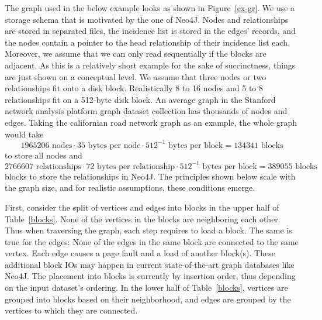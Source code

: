   The graph used in the below example looks as shown in Figure~\ref{ex-gr}.
  We use a storage schema that is motivated by the one of Neo4J.
  Nodes and relationships are stored in separated files, the incidence list is stored in the edges' records, and the nodes contain a pointer to the head relationship of their incidence list each. 
  Moreover, we assume that we can only read sequentially if the blocks are adjacent.
  As this is a relatively short example for the sake of succinctness, things are just shown on a conceptual level. 
  We assume that three nodes or two relationships fit onto a disk block. 
  Realistically 8 to 16 nodes and 5 to 8 relationships fit on a 512-byte disk block. 
  An average graph in the Stanford network analysis platform graph dataset collection has thousands of nodes and edges. 
  Taking the californian road network graph as an example, the whole graph would take 
  \[ 1 965 206 \text{ nodes} \cdot 35 \text{ bytes per node} \cdot 512^{-1} \text{ bytes per block} = 134 341\text{ blocks}\] 
  to store all nodes and 
  \[2 766 607 \text{ relationships} \cdot 72 \text{ bytes per relationship} \cdot 512^{-1} \text{ bytes per block} = 389055\text{ blocks}\] 
  blocks to store the relationships in Neo4J.
  The principles shown below scale with the graph size, and for realistic assumptions, these conditions emerge.

  First, consider the split of vertices and edges into blocks in the upper half of Table~\ref{blocks}. 
  None of the vertices in the blocks are neighboring each other.
  Thus when traversing the graph, each step requires to load a block.
  The same is true for the edges: 
  None of the edges in the same block are connected to the same vertex. 
  Each edge causes a page fault and a load of another block(s).
  These additional block IOs may happen in current state-of-the-art graph databases like Neo4J. 
  The placement into blocks is currently by insertion order, thus depending on the input dataset's ordering. 
  In the lower half of Table~\ref{blocks}, vertices are grouped into blocks based on their neighborhood, and edges are grouped by the vertices to which they are connected.

